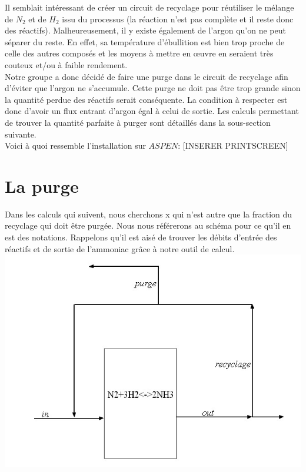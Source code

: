 \documentclass[a4paper, oneside, 12pt]{article}
\begin{document}
Il semblait intéressant de créer un circuit de recyclage pour réutiliser le mélange de $N_2$ et de $H_2$ issu du processus (la réaction n'est pas complète et il reste donc des réactifs). Malheureusement, il y existe également de l'argon qu'on ne peut séparer du reste. En effet, sa température d'ébullition est bien trop proche de celle des autres composés et les moyens à mettre en œuvre en seraient très couteux et/ou à faible rendement. \\
Notre groupe a donc décidé de faire une purge dans le circuit de recyclage afin d'éviter que l'argon ne s'accumule. Cette purge ne doit pas être trop grande sinon la quantité perdue des réactifs serait conséquente. La condition à respecter est donc d'avoir un flux entrant d'argon égal à celui de sortie. Les calculs permettant de trouver la quantité parfaite à purger sont détaillés dans la sous-section suivante.\\
Voici à quoi ressemble l'installation sur $ASPEN$:
[INSERER PRINTSCREEN]

\section{La purge}

Dans les calculs qui suivent, nous cherchons x qui n'est autre que la fraction du recyclage qui doit être purgée. Nous nous référerons au schéma pour ce qu'il en est des notations. Rappelons qu'il est aisé de trouver les débits d'entrée des réactifs et de sortie de l'ammoniac grâce à notre outil de calcul.\\

\includegraphics{etape_finale_simpl.jpg} 
\end{document}
